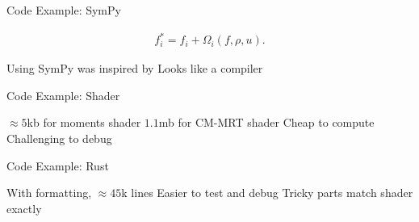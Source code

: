 \begin{frame}{Code Example: SymPy}
  \begin{center}
  \begin{align*}
  f^{*}_i = f_i + \Omega_i(f, \rho, u).
  \end{align*}
  \begin{outline}
    \1 Using SymPy was inspired by \cite{Hennig2023}
    \1 Looks like a compiler
  \end{outline}
  \end{center}
\end{frame}

\begin{frame}{Code Example: Shader}
  \begin{center}
  \end{center}
  \begin{outline}
    \1 $\approx 5$kb for moments shader
    \1 $1.1$mb for CM-MRT shader
    \1 Cheap to compute
    \1 Challenging to debug
  \end{outline}
\end{frame}

\begin{frame}{Code Example: Rust}
  \begin{center}
  \end{center}
  \begin{outline} 
    \1 With formatting, $\approx 45$k lines
    \1 Easier to test and debug
    \1 Tricky parts match shader exactly
\end{outline}
\end{frame}


